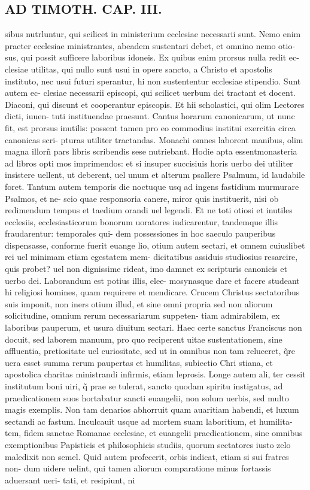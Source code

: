 \documentclass{article}
\begin{document}
\begin{pages}
\section*{AD TIMOTH. CAP. III. }
\marginpar{[ p.501 ]}\pstart sibus nutrluntur, qui scilicet in ministerium ecclesiae necessarii sunt. Nemo enim praeter ecclesiae ministrantes, abeadem sustentari debet, et omnino nemo otio- sus, qui possit sufficere laboribus idoneis. Ex quibus enim prorsus nulla redit ec- clesiae utilitas, qui nullo sunt usui in opere sancto, a Christo et apostolis instituto, nec usui futuri sperantur, hi non sustententur ecclesiae stipendio. Sunt autem ec- clesiae necessarii episcopi, qui scilicet uerbum dei tractant et docent. Diaconi, qui discunt et cooperantur episcopis. Et hii scholastici, qui olim Lectores dicti, iuuen- tuti instituendae praesunt. Cantus horarum canonicarum, ut nunc fit, est prorsus inutilis: possent tamen pro eo commodius institui exercitia circa canonicas scri- pturas utiliter tractandas. Monachi omnes laborent manibus, olim magna illorñ pars libris scribendis sese nutriebant. Hodie apta essentmonasteria ad libros opti mos imprimendos: et si insuper succisiuis horis uerbo dei utiliter insistere uellent, ut deberent, uel unum et alterum psallere Psalmum, id laudabile foret. Tantum autem temporis die noctuque usq ad ingens fastidium murmurare Psalmos, et ne- scio quae responsoria canere, miror quis instituerit, nisi ob redimendum tempus et taedium orandi uel legendi. Et ne toti otiosi et inutiles ecclesiis, ecclesiasticorum bonorum uoratores iudicarentur, tandemque illis fraudarentur: temporales qui- dem possessiones in hoc saeculo pauperibus dispensasse, conforme fuerit euange lio, otium autem sectari, et omnem cuiuslibet rei uel minimam etiam egestatem mem- dicitatibus assiduis studiosius resarcire, quis probet? uel non dignissime rideat, imo damnet ex scripturis canonicis et uerbo dei. Laborandum est potius illis, elee- mosynasque dare et facere studeant hi religiosi homines, quam requirere et mendicare. Crucem Christus sectatoribus suis imponit, non iners otium illud, et sine omni propria sed non aliorum solicitudine, omnium rerum necessariarum suppeten- tiam admirabilem, ex laboribus pauperum, et usura diuitum sectari. Haec certe sanctus Franciscus non docuit, sed laborem manuum, pro quo reciperent uitae sustentationem, sine affluentia, pretiositate uel curiositate, sed ut in omnibus non tam reluceret, q̃re uera esset summa rerum paupertas et humilitas, subiectio Chri stiana, et apostolica charitas ministrandi infirmis, etiam leprosis. Longe autem ali, ter cessit institutum boni uiri, q̃ prae se tulerat, sancto quodam spiritu instigatus, ad praedicationem suos hortabatur sancti euangelii, non solum uerbis, sed multo magis exemplis. Non tam denarios abhorruit quam auaritiam habendi, et luxum sectandi ac fastum. Inculcauit usque ad mortem suam laboritium, et humilita- tem, fidem sanctae Romanae ecclesiae, et euangelii praedicationem, sine omnibus exemptionibus Papisticis et philosophicis studiis, quorum sectatores iusto zelo maledixit non semel. Quid autem profecerit, orbis indicat, etiam si sui fratres non- dum uidere uelint, qui tamen aliorum comparatione minus fortassis aduersant ueri- tati, et resipiunt, ni 
\end{pages}
\end{document}

